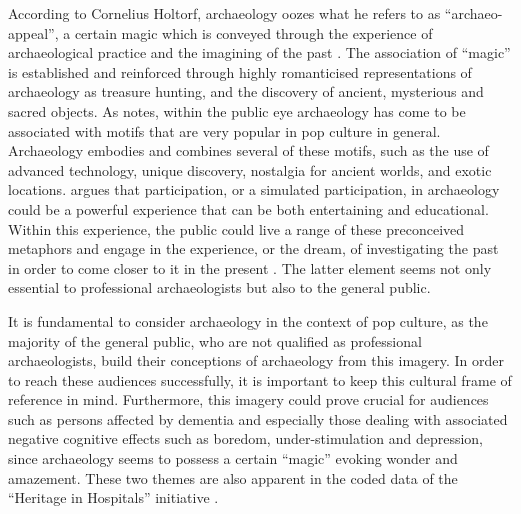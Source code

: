 	According to Cornelius Holtorf, archaeology oozes what he refers to as “archaeo-appeal”, a certain magic which  is conveyed through the experience of archaeological practice and the imagining of the past \parencite[156]{Holtorf_2005}. The association of “magic” is established and reinforced through highly romanticised representations of archaeology as treasure hunting, and the discovery of ancient, mysterious and sacred objects. As \textcite[156]{Holtorf_2005} notes, within the public eye archaeology has come to be associated with motifs that are very popular in pop culture in general. Archaeology embodies and combines several of these motifs, such as the use of advanced technology, unique discovery, nostalgia for ancient worlds, and exotic locations. \textcite[157]{Holtorf_2005} argues that participation, or a simulated participation, in archaeology could be a powerful experience that can be both entertaining and educational. Within this experience, the public could live a range of these preconceived metaphors and engage in the experience, or the dream, of investigating the past in order to come closer to it in the present \parencite[156--157]{Holtorf_2005}. The latter element seems not only essential to professional archaeologists but also to the general public.	
	
	It is fundamental to consider archaeology in the context of pop culture, as the majority of the general public, who are not qualified as professional archaeologists, build their conceptions of archaeology from this imagery. In order to reach these audiences successfully, it is important to keep this cultural frame of reference in mind. Furthermore, this imagery could prove crucial for audiences such as persons affected by dementia and especially those dealing with associated negative cognitive effects such as boredom, under-stimulation and depression, since archaeology seems to possess a certain “magic” evoking wonder and amazement. These two themes are also apparent in the coded data of the “Heritage in Hospitals” initiative \parencite[235]{AnderE_2013}.						 
	
	
